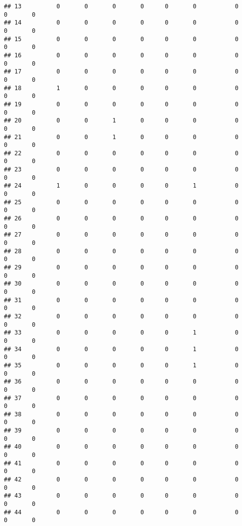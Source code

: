 \documentclass[
]{article}
\begin{document}
\begin{verbatim}
## 13          0       0       0       0      0       0           0      0       0
## 14          0       0       0       0      0       0           0      0       0
## 15          0       0       0       0      0       0           0      0       0
## 16          0       0       0       0      0       0           0      0       0
## 17          0       0       0       0      0       0           0      0       0
## 18          1       0       0       0      0       0           0      0       0
## 19          0       0       0       0      0       0           0      0       0
## 20          0       0       1       0      0       0           0      0       0
## 21          0       0       1       0      0       0           0      0       0
## 22          0       0       0       0      0       0           0      0       0
## 23          0       0       0       0      0       0           0      0       0
## 24          1       0       0       0      0       1           0      0       0
## 25          0       0       0       0      0       0           0      0       0
## 26          0       0       0       0      0       0           0      0       0
## 27          0       0       0       0      0       0           0      0       0
## 28          0       0       0       0      0       0           0      0       0
## 29          0       0       0       0      0       0           0      0       0
## 30          0       0       0       0      0       0           0      0       0
## 31          0       0       0       0      0       0           0      0       0
## 32          0       0       0       0      0       0           0      0       0
## 33          0       0       0       0      0       1           0      0       0
## 34          0       0       0       0      0       1           0      0       0
## 35          0       0       0       0      0       1           0      0       0
## 36          0       0       0       0      0       0           0      0       0
## 37          0       0       0       0      0       0           0      0       0
## 38          0       0       0       0      0       0           0      0       0
## 39          0       0       0       0      0       0           0      0       0
## 40          0       0       0       0      0       0           0      0       0
## 41          0       0       0       0      0       0           0      0       0
## 42          0       0       0       0      0       0           0      0       0
## 43          0       0       0       0      0       0           0      0       0
## 44          0       0       0       0      0       0           0      0       0

\end{verbatim}
\end{document}
